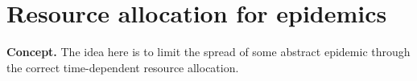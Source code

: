 \chapter{\sffamily Resource allocation for epidemics}

{\bfseries\sffamily Concept.} The idea here is to limit the spread of some abstract epidemic through the correct time-dependent resource allocation.